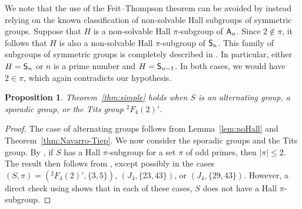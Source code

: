 \documentclass[12pt]{amsart}
\newtheorem{proposition}[theorem]{Proposition}
\theoremstyle{definition}
\numberwithin{equation}{section}
\newcommand{\Irr}{{\mathrm {Irr}}}
\newcommand{\QQ}{{\mathbb Q}}
\newcommand{\ZZ}{{\mathbb Z}}
\newcommand{\Al}{\textup{\textsf{A}}}
\newcommand{\Sy}{\textup{\textsf{S}}}
\begin{document}
We note that the use of the Feit--Thompson theorem can be avoided by
instead relying on the known classification %
of non-solvable Hall
subgroups of %
symmetric groups. Suppose that $H$ is %
a non-solvable
Hall $\pi$-subgroup %
of $\Al_n$. Since $2 \notin \pi$, it follows
that $H$ is also %
a non-solvable Hall %
$\pi$-subgroup of $\Sy_n$. This
family of subgroups of symmetric groups is completely described in
\cite{Thompson}. In particular, either $H = \Sy_n$ or $n$ is a prime
number and $H = \Sy_{n-1}$. In both cases, we would have $2 \in
\pi$, which again contradicts our %
hypothesis.



\begin{proposition}\label{prop:alternatingandsporadic}
Theorem~\ref{thm:simple} holds when $S$ is an alternating group, a
sporadic group, %
or the Tits group ${}^2F_4(2)'$.
\end{proposition}

\begin{proof}
The case of alternating groups follows from Lemma~\ref{lem:noHall}
and Theorem~\ref{thm:Navarro-Tiep}. We now consider the sporadic
groups and the Tits group. By \cite[Theorem~6.14]{G86}, if $S$ has a
Hall $\pi$-subgroup for a set $\pi$ of odd primes, then $|\pi| \le
2$. The result then follows from \cite[Theorem~2.1]{GHSV21}, except
possibly in the cases $(S,\pi)=({}^2F_4(2)',\{3,5\})$, $(J_4,
\{23,43\})$, or $(J_4,\{29,43\})$. However, a direct check using
\cite{Atl1} shows that in each of these cases, $S$ does not have a
Hall $\pi$-subgroup.
\end{proof}
\end{document}
